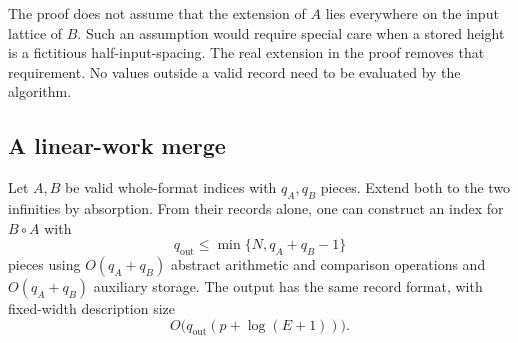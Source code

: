 \begin{remark}
The proof does not assume that the extension of $A$ lies everywhere on
the input lattice of $B$. Such an assumption would require special care
when a stored height is a fictitious half-input-spacing. The real
extension in the proof removes that requirement. No values outside a
valid record need to be evaluated by the algorithm.
\end{remark}

\subsection{A linear-work merge}

\begin{theorem}\label{merge:thm:merge}
Let $A,B$ be valid whole-format indices with $q_A,q_B$ pieces. Extend
both to the two infinities by absorption. From their records alone, one
can construct an index for $B\circ A$ with
\[
 q_{\mathrm{out}}\leq\min\{N,q_A+q_B-1\}
\]
pieces using $O(q_A+q_B)$ abstract arithmetic and comparison operations
and $O(q_A+q_B)$ auxiliary storage. The output has the same record
format, with fixed-width description size
\[
 O\bigl(q_{\mathrm{out}}(p+\log(E+1))\bigr).
\]
\end{theorem}

